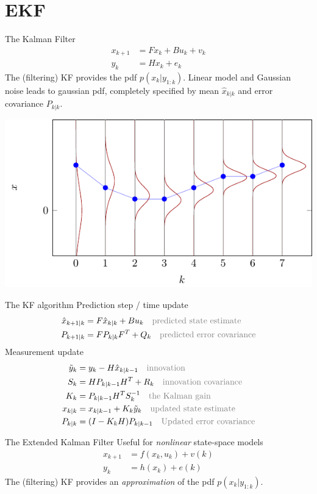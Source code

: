 \documentclass[presentation,aspectratio=169]{beamer}
\begin{document}
\section{EKF}
\label{sec-2}
\begin{frame}[label=sec-2-1]{The Kalman Filter}
\begin{align*}
x_{k+1} &= Fx_k + Bu_k + v_k\\
y_k &= Hx_k+ e_k
\end{align*}
The (filtering) KF provides the pdf $p(x_k|y_{1:k})$. Linear model and Gaussian noise leads to gaussian pdf, completely specified by mean $\hat{x}_{k|k}$ and error covariance $P_{k|k}$. 
\begin{center}
\includegraphics[width=0.6\linewidth]{kf-propagation.pdf}
\end{center}
\end{frame}
\begin{frame}[label=sec-2-2]{The KF algorithm}
Prediction step / time update
\begin{align*} 
\hat{x}_{k+1|k} &= F\hat{x}_{k|k} + Bu_k \quad \text{\textcolor{gray}{predicted state estimate}}\\
P_{k+1|k} &= FP_{k|k}F^T + Q_k \quad \text{\textcolor{gray}{predicted error covariance}}
\end{align*}
Measurement update
\begin{align*}
\tilde{y}_k &= y_k - H\hat{x}_{k|k-1} \quad \text{\textcolor{gray}{innovation}}\\
S_k &= HP_{k|k-1}H^T + R_k \quad \text{\textcolor{gray}{innovation covariance}}\\
K_k &= P_{k|k-1}H^TS_k^{-1}\quad \text{\textcolor{gray}{the Kalman gain}}\\
x_{k|k} &= x_{k|k-1} + K_k\tilde{y}_k \quad \text{\textcolor{gray}{updated state estimate}}\\
P_{k|k} &= (I - K_kH)P_{k|k-1} \quad \text{\textcolor{gray}{Updated error covariance}}
\end{align*}
\end{frame}
\begin{frame}[label=sec-2-3]{The Extended Kalman Filter}
Useful for \emph{nonlinear} state-space models
\begin{align*}
x_{k+1} &= f(x_k, u_k) + v(k)\\
y_k &= h(x_k) + e(k)
\end{align*}
The (filtering) KF provides an \emph{approximation} of the pdf $p(x_k|y_{1:k})$.
\end{frame}
\end{document}

